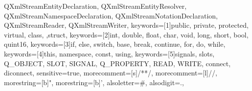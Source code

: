 {{QXmlStreamEntityDeclaration, QXmlStreamEntityResolver,
QXmlStreamNamespaceDeclaration, QXmlStreamNotationDeclaration, QXmlStreamReader,
QXmlStreamWriter},
  keywords=[1]{public, private, protected, virtual, class, ,struct},
  keywords=[2]{int, double, float, char, void, long, short, bool, quint16},
  keywords=[3]{if, else, switch, base, break, continue, for, do, while},
  keywords=[4]{this, namespace, const, using},
  keywords=[5]{signals, slots, Q_OBJECT, SLOT, SIGNAL, Q_PROPERTY, READ, WRITE, 
connect, diconnect},
  sensitive=true,
  morecomment=[s]{/*}{*/},%
  morecomment=[l]//,%
  morestring=[b]",%
  morestring=[b]',
  alsoletter={\#},
  alsodigit={.}, 
}

